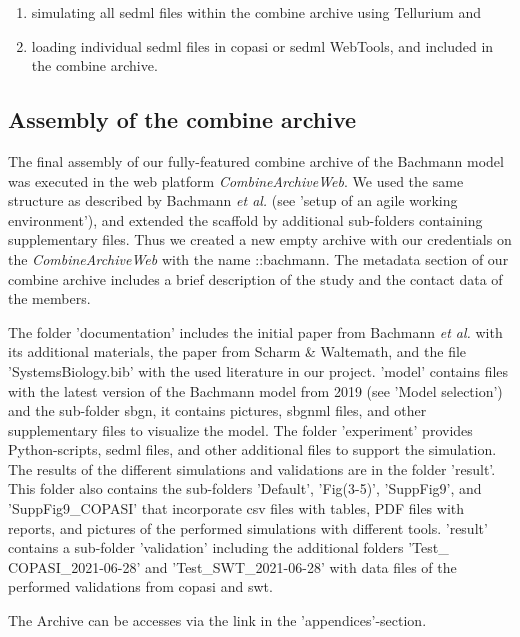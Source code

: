 \begin{enumerate}
    \item simulating all \ac{sedml} files within the \ac{combine} archive using Tellurium and
    \item loading individual \ac{sedml} files in \ac{copasi} or \ac{sedml} WebTools, and included in the \ac{combine} archive.
\end{enumerate}

\subsection*{Assembly of the \acs{combine} archive}

The final assembly of our fully-featured \ac{combine} archive of the Bachmann model was executed in the web platform \textit{CombineArchiveWeb}. We used the same structure as described by Bachmann \textit{et al.} (see 'setup of an agile working environment'), and extended the scaffold by additional sub-folders containing supplementary files. Thus we created a new empty archive with our credentials on the \textit{CombineArchiveWeb} with the name \textsf{::bachmann}. The metadata section of our \ac{combine} archive includes a brief description of the study and the contact data of the members.

The folder 'documentation' includes the initial paper from Bachmann \textit{et al.}  with its additional materials, the paper from Scharm \& Waltemath, and the file 'SystemsBiology.bib' with the used literature in our project. 'model' contains files with the latest version of the Bachmann model from 2019 (see 'Model selection') and the sub-folder \textsf{sbgn}, it contains pictures, \ac{sbgnml} files, and other supplementary files to visualize the model. The folder 'experiment' provides Python-scripts, \ac{sedml} files, and other additional files to support the simulation. The results of the different simulations and validations are in the folder 'result'. This folder also contains the sub-folders 'Default', 'Fig(3-5)', 'SuppFig9', and 'SuppFig9\_COPASI' that incorporate \ac{csv} files with tables, PDF files with reports, and pictures of the performed simulations with different tools.  'result' contains a sub-folder 'validation'  including the additional folders 'Test\_ COPASI\_2021-06-28' and 'Test\_SWT\_2021-06-28' with data files of the performed validations from \ac{copasi} and \ac{swt}.

The Archive can be accesses via the link in the 'appendices'-section.